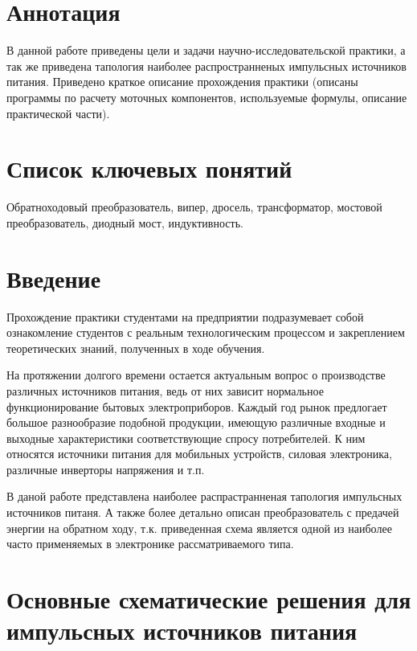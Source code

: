 


\setcounter{page}{3}

\section*{Аннотация}

	В данной работе приведены цели и задачи научно-исследовательской практики, а так же приведена тапология наиболее распространненых импульсных источников питания. Приведено краткое описание прохождения практики (описаны программы по расчету моточных компонентов, используемые формулы, описание практической части).

\section*{Список ключевых понятий}

Обратноходовый преобразователь, випер, дросель, трансформатор, мостовой преобразователь, диодный мост, индуктивность.

\newpage

\tableofcontents
\newpage

\section*{Введение}

	Прохождение практики студентами на предприятии подразумевает собой ознакомление студентов с реальным технологическим процессом и закреплением теоретических знаний, полученных в ходе обучения.
	
	На протяжении долгого времени остается актуальным вопрос о производстве различных источников питания, ведь от них зависит нормальное функционирование бытовых электроприборов. Каждый год рынок предлогает большое разнообразие подобной продукции, имеющую различные входные и выходные характеристики соответствующие спросу потребителей. К ним относятся источники питания для мобильных устройств, силовая электроника, различные инверторы напряжения и т.п.
	
	В даной работе представлена наиболее распрастранненая тапология импульсных источников питаня. А также более детально описан преобразователь с предачей энергии на обратном ходу, т.к. приведенная схема является одной из наиболее часто применяемых в электронике рассматриваемого типа.
\newpage

\section{Основные схематические решения для импульсных источников питания}

